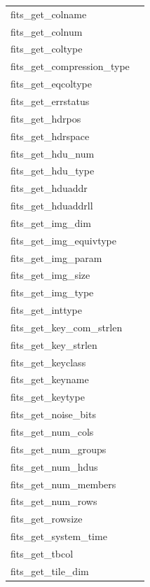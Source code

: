 \documentclass[11pt]{book}
\begin{document}
\begin{tabular}{lr}
fits\_get\_colname    & \pageref{ffgcnn} \\
fits\_get\_colnum     & \pageref{ffgcno} \\
fits\_get\_coltype    & \pageref{ffgtcl} \\
fits\_get\_compression\_type & \pageref{ffgetcomp} \\
fits\_get\_eqcoltype    & \pageref{ffgtcl} \\
fits\_get\_errstatus  & \pageref{ffgerr} \\
fits\_get\_hdrpos        & \pageref{ffghps} \\
fits\_get\_hdrspace      & \pageref{ffghsp} \\
fits\_get\_hdu\_num    & \pageref{ffghdn} \\
fits\_get\_hdu\_type   & \pageref{ffghdt} \\
fits\_get\_hduaddr    & \pageref{ffghad} \\
fits\_get\_hduaddrll    & \pageref{ffghad} \\
fits\_get\_img\_dim & \pageref{ffgidm} \\
fits\_get\_img\_equivtype & \pageref{ffgidt} \\
fits\_get\_img\_param & \pageref{ffgipr} \\
fits\_get\_img\_size & \pageref{ffgisz} \\
fits\_get\_img\_type & \pageref{ffgidt} \\
fits\_get\_inttype    & \pageref{ffinttyp} \\
fits\_get\_key\_com\_strlen & \pageref{ffgkcsl} \\
fits\_get\_key\_strlen & \pageref{ffgksl} \\
fits\_get\_keyclass    & \pageref{ffgkcl} \\
fits\_get\_keyname    & \pageref{ffgknm} \\
fits\_get\_keytype    & \pageref{ffdtyp} \\
fits\_get\_noise\_bits   & \pageref{ffgetcomp} \\
fits\_get\_num\_cols     & \pageref{ffgnrw} \\
fits\_get\_num\_groups  & \pageref{ffgmng} \\
fits\_get\_num\_hdus   & \pageref{ffthdu} \\
fits\_get\_num\_members  & \pageref{ffgtnm} \\
fits\_get\_num\_rows     & \pageref{ffgnrw} \\
fits\_get\_rowsize    & \pageref{ffgrsz} \\
fits\_get\_system\_time  & \pageref{ffdt2s} \\
fits\_get\_tbcol      & \pageref{ffgabc} \\
fits\_get\_tile\_dim     & \pageref{ffgetcomp} \\
\end{tabular}
\end{document}
